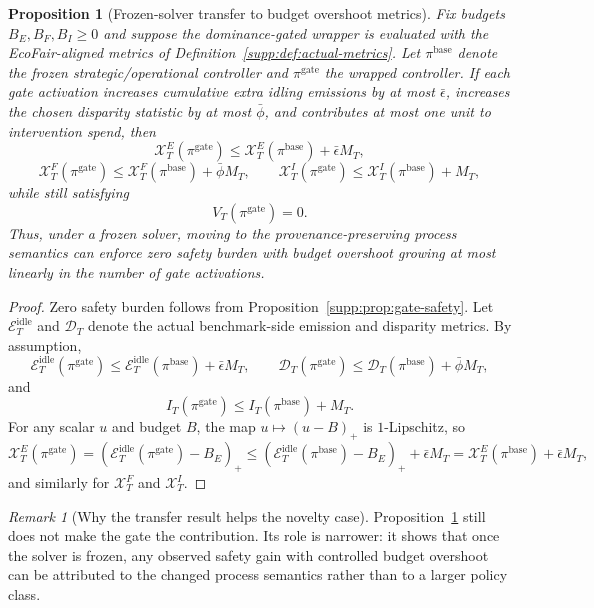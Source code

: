 \documentclass[11pt]{article}
\newcommand{\1}{\mathbf{1}}
\theoremstyle{definition}
\theoremstyle{plain}
\newtheorem{proposition}[definition]{Proposition}
\theoremstyle{remark}
\newtheorem{remark}[definition]{Remark}
\begin{document}
\begin{proposition}[Frozen-solver transfer to budget overshoot metrics]
\label{supp:prop:overshoot-transfer}
Fix budgets $B_E,B_F,B_I\ge 0$ and suppose the dominance-gated wrapper is evaluated with the EcoFair-aligned metrics of Definition~\ref{supp:def:actual-metrics}. Let $\pi^{\mathrm{base}}$ denote the frozen strategic/operational controller and $\pi^{\mathrm{gate}}$ the wrapped controller. If each gate activation increases cumulative extra idling emissions by at most $\bar\epsilon$, increases the chosen disparity statistic by at most $\bar\phi$, and contributes at most one unit to intervention spend, then
\[
\mathcal X_T^{E}(\pi^{\mathrm{gate}})
\le
\mathcal X_T^{E}(\pi^{\mathrm{base}})+\bar\epsilon M_T,
\]
\[
\mathcal X_T^{F}(\pi^{\mathrm{gate}})
\le
\mathcal X_T^{F}(\pi^{\mathrm{base}})+\bar\phi M_T,
\qquad
\mathcal X_T^{I}(\pi^{\mathrm{gate}})
\le
\mathcal X_T^{I}(\pi^{\mathrm{base}})+ M_T,
\]
while still satisfying
\[
V_T(\pi^{\mathrm{gate}})=0.
\]
Thus, under a frozen solver, moving to the provenance-preserving process semantics can enforce zero safety burden with budget overshoot growing at most linearly in the number of gate activations.
\end{proposition}

\begin{proof}
Zero safety burden follows from Proposition~\ref{supp:prop:gate-safety}. Let $\mathcal E_T^{\mathrm{idle}}$ and $\mathcal D_T$ denote the actual benchmark-side emission and disparity metrics. By assumption,
\[
\mathcal E_T^{\mathrm{idle}}(\pi^{\mathrm{gate}})
\le
\mathcal E_T^{\mathrm{idle}}(\pi^{\mathrm{base}})+\bar\epsilon M_T,
\qquad
\mathcal D_T(\pi^{\mathrm{gate}})
\le
\mathcal D_T(\pi^{\mathrm{base}})+\bar\phi M_T,
\]
and
\[
I_T(\pi^{\mathrm{gate}})
\le
I_T(\pi^{\mathrm{base}})+M_T.
\]
For any scalar $u$ and budget $B$, the map $u\mapsto (u-B)_+$ is $1$-Lipschitz, so
\[
\mathcal X_T^{E}(\pi^{\mathrm{gate}})
=
(\mathcal E_T^{\mathrm{idle}}(\pi^{\mathrm{gate}})-B_E)_+
\le
(\mathcal E_T^{\mathrm{idle}}(\pi^{\mathrm{base}})-B_E)_+ + \bar\epsilon M_T
=
\mathcal X_T^{E}(\pi^{\mathrm{base}})+\bar\epsilon M_T,
\]
and similarly for $\mathcal X_T^{F}$ and $\mathcal X_T^{I}$.
\end{proof}

\begin{remark}[Why the transfer result helps the novelty case]
\label{supp:rem:overshoot-transfer}
Proposition~\ref{supp:prop:overshoot-transfer} still does not make the gate the contribution. Its role is narrower: it shows that once the solver is frozen, any observed safety gain with controlled budget overshoot can be attributed to the changed process semantics rather than to a larger policy class.
\end{remark}
\end{document}
